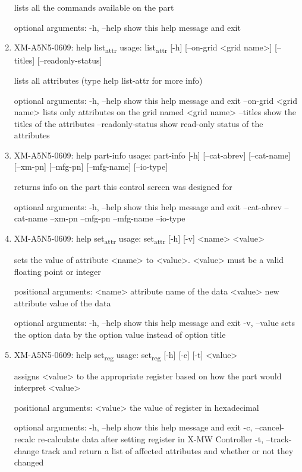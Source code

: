 \documentclass[11pt]{article}
\begin{document}
\begin{enumerate}
lists all the commands available on the part

optional arguments:
  -h, --help  show this help message and exit

\item XM-A5N5-0609: help list\textsubscript{attr}
\label{sec:orgc8fe42f}
usage: list\textsubscript{attr} [-h] [--on-grid <grid name>] [--titles] [--readonly-status]

lists all attributes (type help list-attr for more info)

optional arguments:
  -h, --help            show this help message and exit
  --on-grid <grid name>
                        lists only attributes on the grid named <grid name>
  --titles              show the titles of the attributes
  --readonly-status     show read-only status of the attributes

\item XM-A5N5-0609: help part-info
\label{sec:org3bf8f63}
usage: part-info  [-h] [--cat-abrev] [--cat-name] [--xm-pn] [--mfg-pn] [--mfg-name]
        [--io-type]

returns info on the part this control screen was designed for

optional arguments:
  -h, --help   show this help message and exit
  --cat-abrev
  --cat-name
  --xm-pn
  --mfg-pn
  --mfg-name
  --io-type

\item XM-A5N5-0609: help set\textsubscript{attr}
\label{sec:orgf361c1f}
usage: set\textsubscript{attr} [-h] [-v] <name> <value>

sets the value of attribute <name> to <value>. <value> must be a valid
floating point or integer

positional arguments:
  <name>       attribute name of the data
  <value>      new attribute value of the data

optional arguments:
  -h, --help   show this help message and exit
  -v, --value  sets the option data by the option value instead of option
               title

\item XM-A5N5-0609: help set\textsubscript{reg}
\label{sec:orgdd6fa01}
usage: set\textsubscript{reg} [-h] [-c] [-t] <value>

assigns <value> to the appropriate register based on how the part would
interpret <value>

positional arguments:
  <value>              the value of register in hexadecimal

optional arguments:
  -h, --help           show this help message and exit
  -c, --cancel-recalc  re-calculate data after setting register in X-MW
                       Controller
  -t, --track-change   track and return a list of affected attributes and
                       whether or not they changed


\end{enumerate}
\end{document}
